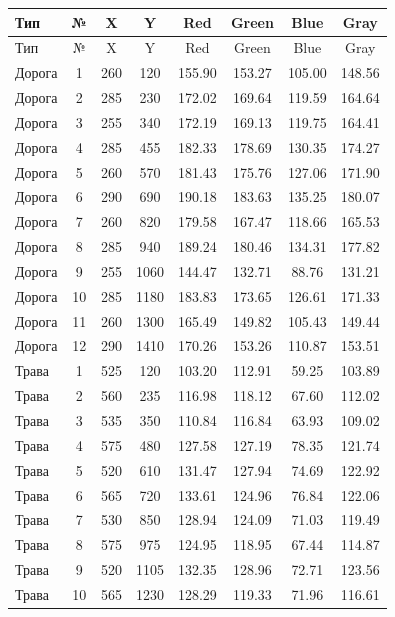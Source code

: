 \documentclass[a4paper,14pt]{extarticle}
\begin{document}
\begin{longtable}{|l|c|c|c|c|c|c|c|}
\hline
Тип & № & X & Y & Red & Green & Blue & Gray \\\hline
\endfirsthead
\hline
Тип & № & X & Y & Red & Green & Blue & Gray \\\hline
\endhead
Дорога & 1 & 260 & 120 & 155.90 & 153.27 & 105.00 & 148.56 \\ \hline
Дорога & 2 & 285 & 230 & 172.02 & 169.64 & 119.59 & 164.64 \\ \hline
Дорога & 3 & 255 & 340 & 172.19 & 169.13 & 119.75 & 164.41 \\ \hline
Дорога & 4 & 285 & 455 & 182.33 & 178.69 & 130.35 & 174.27 \\ \hline
Дорога & 5 & 260 & 570 & 181.43 & 175.76 & 127.06 & 171.90 \\ \hline
Дорога & 6 & 290 & 690 & 190.18 & 183.63 & 135.25 & 180.07 \\ \hline
Дорога & 7 & 260 & 820 & 179.58 & 167.47 & 118.66 & 165.53 \\ \hline
Дорога & 8 & 285 & 940 & 189.24 & 180.46 & 134.31 & 177.82 \\ \hline
Дорога & 9 & 255 & 1060 & 144.47 & 132.71 & 88.76 & 131.21 \\ \hline
Дорога & 10 & 285 & 1180 & 183.83 & 173.65 & 126.61 & 171.33 \\ \hline
Дорога & 11 & 260 & 1300 & 165.49 & 149.82 & 105.43 & 149.44 \\ \hline
Дорога & 12 & 290 & 1410 & 170.26 & 153.26 & 110.87 & 153.51 \\ \hline
Трава & 1 & 525 & 120 & 103.20 & 112.91 & 59.25 & 103.89 \\ \hline
Трава & 2 & 560 & 235 & 116.98 & 118.12 & 67.60 & 112.02 \\ \hline
Трава & 3 & 535 & 350 & 110.84 & 116.84 & 63.93 & 109.02 \\ \hline
Трава & 4 & 575 & 480 & 127.58 & 127.19 & 78.35 & 121.74 \\ \hline
Трава & 5 & 520 & 610 & 131.47 & 127.94 & 74.69 & 122.92 \\ \hline
Трава & 6 & 565 & 720 & 133.61 & 124.96 & 76.84 & 122.06 \\ \hline
Трава & 7 & 530 & 850 & 128.94 & 124.09 & 71.03 & 119.49 \\ \hline
Трава & 8 & 575 & 975 & 124.95 & 118.95 & 67.44 & 114.87 \\ \hline
Трава & 9 & 520 & 1105 & 132.35 & 128.96 & 72.71 & 123.56 \\ \hline
Трава & 10 & 565 & 1230 & 128.29 & 119.33 & 71.96 & 116.61 \\ \hline

\end{longtable}
\end{document}
